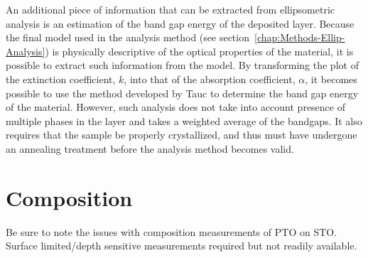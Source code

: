 An additional piece of information that can be extracted from ellipsometric analysis is an estimation of the band gap energy of the deposited layer. Because the final model used in the analysis method (see section~\vref{chap:Methods-Ellip-Analysis}) is physically descriptive of the optical properties of the material, it is possible to extract such information from the model. By transforming the plot of the extinction coefficient, $k$, into that of the absorption coefficient, $\alpha$, it becomes possible to use the method developed by Tauc  to determine the band gap energy of the material. However, such analysis does not take into account presence of multiple phases in the layer and takes a weighted average of the bandgaps. It also requires that the sample be properly crystallized, and thus must have undergone an annealing treatment before the analysis method becomes valid. 


\section{Composition}
\label{chap:Results-Composition}



Be sure to note the issues with composition measurements of PTO on STO. Surface limited/depth sensitive measurements required but not readily available. 

